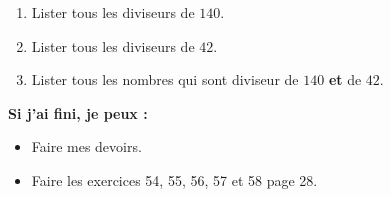 \documentclass[a4paper,12pt]{article}
\begin{document}
\begin{exercice}
	\begin{enumerate}
		\item Lister tous les diviseurs de $140$.
		\item Lister tous les diviseurs de $42$.
		\item Lister tous les nombres qui sont diviseur de $140$ \textbf{et} de $42$.
	\end{enumerate}
\end{exercice}

\textbf{Si j'ai fini, je peux : \\}

\begin{itemize}
	\item Faire mes devoirs.
	\item Faire les exercices 54, 55, 56, 57 et 58 page 28.
\end{itemize}
\end{document}
